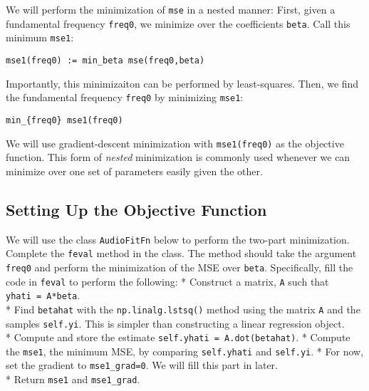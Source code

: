 \documentclass[11pt]{article}
\begin{document}
We will perform the minimization of \texttt{mse} in a nested manner:
First, given a fundamental frequency \texttt{freq0}, we minimize over
the coefficients \texttt{beta}. Call this minimum \texttt{mse1}:

\begin{verbatim}
mse1(freq0) := min_beta mse(freq0,beta)
\end{verbatim}

Importantly, this minimizaiton can be performed by least-squares. Then,
we find the fundamental frequency \texttt{freq0} by minimizing
\texttt{mse1}:

\begin{verbatim}
min_{freq0} mse1(freq0) 
\end{verbatim}

We will use gradient-descent minimization with \texttt{mse1(freq0)} as
the objective function. This form of \emph{nested} minimization is
commonly used whenever we can minimize over one set of parameters easily
given the other.

    \subsection{Setting Up the Objective
Function}\label{setting-up-the-objective-function}

We will use the class \texttt{AudioFitFn} below to perform the two-part
minimization. Complete the \texttt{feval} method in the class. The
method should take the argument \texttt{freq0} and perform the
minimization of the MSE over \texttt{beta}. Specifically, fill the code
in \texttt{feval} to perform the following: * Construct a matrix,
\texttt{A} such that \texttt{yhati\ =\ A*beta}.\\
* Find \texttt{betahat} with the \texttt{np.linalg.lstsq()} method using
the matrix \texttt{A} and the samples \texttt{self.yi}. This is simpler
than constructing a linear regression object.\\
* Compute and store the estimate \texttt{self.yhati\ =\ A.dot(betahat)}.
* Compute the \texttt{mse1}, the minimum MSE, by comparing
\texttt{self.yhati} and \texttt{self.yi}. * For now, set the gradient to
\texttt{mse1\_grad=0}. We will fill this part in later.\\
* Return \texttt{mse1} and \texttt{mse1\_grad}.
\end{document}
